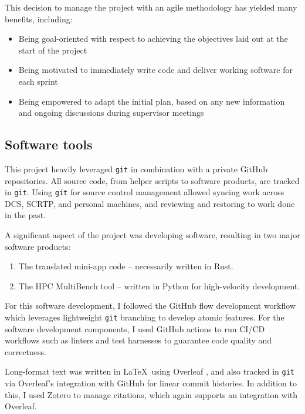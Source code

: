 This decision to manage the project with an agile methodology has yielded many benefits, including:

\begin{itemize}
    \item Being goal-oriented with respect to achieving the objectives laid out at the start of the project
    \item Being motivated to immediately write code and deliver working software for each sprint
    \item Being empowered to adapt the initial plan, based on any new information and ongoing discussions during supervisor meetings
\end{itemize}

\subsection{Software tools}
\label{ssec:software-tools}

This project heavily leveraged \texttt{git} in combination with a private GitHub repositories. All source code, from helper scripts to software products, are tracked in \texttt{git}. Using \texttt{git} for source control management allowed syncing work across DCS, SCRTP, and personal machines, and reviewing and restoring to work done in the past.

A significant aspect of the project was developing software, resulting in two major software products:

\begin{enumerate}
    \item The translated \acrshort{mini-app} code -- necessarily written in Rust.
    \item The HPC MultiBench tool -- written in Python for high-velocity development.
\end{enumerate}

For this software development, I followed the GitHub flow development workflow \cite{GitHubFlow} which leverages lightweight \texttt{git} branching to develop atomic features. For the software development components, I used GitHub actions to run CI/CD workflows \cite{WhatCICD} such as linters and test harnesses to guarantee code quality and correctness.

Long-format text was written in \LaTeX\ using Overleaf \cite{OverleafOnlineLaTeX}, and also tracked in \texttt{git} via Overleaf's integration with GitHub for linear commit histories. In addition to this, I used Zotero \cite{ZoteroYourPersonal} to manage citations, which again supports an integration with Overleaf.

